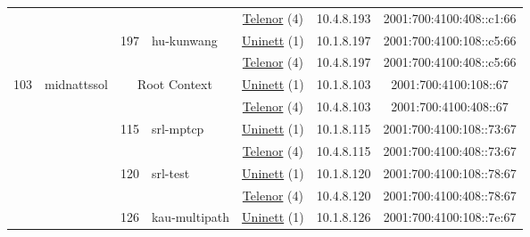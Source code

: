 \begin{small}
\begin{center}
\begin{longtable}{|c|c|c|c|c|c|c|c|}
  &  &  &  & \multicolumn{2}{|c|}{\tiny{\href{https://www.telenor.no}{Telenor} (4)}} & \tiny{10.4.8.193} & \tiny{2001:700:4100:408::c1:66} \\* \cline{3-3}\cline{4-4}\cline{5-5}\cline{6-6}\cline{7-7}\cline{8-8}
  &  & \multirow{2}{*}{\tiny{197}} & \multicolumn{1}{|l|}{\multirow{2}{*}{\tiny{hu-kunwang}}} & \multicolumn{2}{|c|}{\tiny{\href{https://www.uninett.no}{Uninett} (1)}} & \tiny{10.1.8.197} & \tiny{2001:700:4100:108::c5:66} \\* \cline{5-5}\cline{6-6}\cline{7-7}\cline{8-8}
  &  &  &  & \multicolumn{2}{|c|}{\tiny{\href{https://www.telenor.no}{Telenor} (4)}} & \tiny{10.4.8.197} & \tiny{2001:700:4100:408::c5:66} \\ \hline
 \multirow{24}{*}{\tiny{103}} & \multicolumn{1}{|l|}{\multirow{24}{*}{\tiny{midnattssol}}} & \multicolumn{2}{|c|}{\multirow{2}{*}{\tiny{Root Context}}} & \multicolumn{2}{|c|}{\tiny{\href{https://www.uninett.no}{Uninett} (1)}} & \tiny{10.1.8.103} & \tiny{2001:700:4100:108::67} \\* \cline{5-5}\cline{6-6}\cline{7-7}\cline{8-8}
  &  & \multicolumn{2}{|c|}{} & \multicolumn{2}{|c|}{\tiny{\href{https://www.telenor.no}{Telenor} (4)}} & \tiny{10.4.8.103} & \tiny{2001:700:4100:408::67} \\* \cline{3-3}\cline{4-4}\cline{5-5}\cline{6-6}\cline{7-7}\cline{8-8}
  &  & \multirow{2}{*}{\tiny{115}} & \multicolumn{1}{|l|}{\multirow{2}{*}{\tiny{srl-mptcp}}} & \multicolumn{2}{|c|}{\tiny{\href{https://www.uninett.no}{Uninett} (1)}} & \tiny{10.1.8.115} & \tiny{2001:700:4100:108::73:67} \\* \cline{5-5}\cline{6-6}\cline{7-7}\cline{8-8}
  &  &  &  & \multicolumn{2}{|c|}{\tiny{\href{https://www.telenor.no}{Telenor} (4)}} & \tiny{10.4.8.115} & \tiny{2001:700:4100:408::73:67} \\* \cline{3-3}\cline{4-4}\cline{5-5}\cline{6-6}\cline{7-7}\cline{8-8}
  &  & \multirow{2}{*}{\tiny{120}} & \multicolumn{1}{|l|}{\multirow{2}{*}{\tiny{srl-test}}} & \multicolumn{2}{|c|}{\tiny{\href{https://www.uninett.no}{Uninett} (1)}} & \tiny{10.1.8.120} & \tiny{2001:700:4100:108::78:67} \\* \cline{5-5}\cline{6-6}\cline{7-7}\cline{8-8}
  &  &  &  & \multicolumn{2}{|c|}{\tiny{\href{https://www.telenor.no}{Telenor} (4)}} & \tiny{10.4.8.120} & \tiny{2001:700:4100:408::78:67} \\* \cline{3-3}\cline{4-4}\cline{5-5}\cline{6-6}\cline{7-7}\cline{8-8}
  &  & \multirow{2}{*}{\tiny{126}} & \multicolumn{1}{|l|}{\multirow{2}{*}{\tiny{kau-multipath}}} & \multicolumn{2}{|c|}{\tiny{\href{https://www.uninett.no}{Uninett} (1)}} & \tiny{10.1.8.126} & \tiny{2001:700:4100:108::7e:67} \\* \cline{5-5}\cline{6-6}\cline{7-7}\cline{8-8}

\end{longtable}
\end{center}
\end{small}
